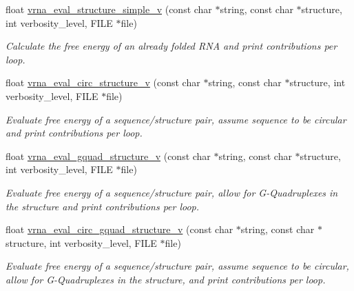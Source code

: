 \begin{DoxyCompactItemize}
float \mbox{\hyperlink{group__eval_gacd6278343e77d13f1d53588e50d303bc}{vrna\+\_\+eval\+\_\+structure\+\_\+simple\+\_\+v}} (const char $\ast$string, const char $\ast$structure, int verbosity\+\_\+level, F\+I\+LE $\ast$file)
\begin{DoxyCompactList}\small\item\em Calculate the free energy of an already folded R\+NA and print contributions per loop. \end{DoxyCompactList}\item 
float \mbox{\hyperlink{group__eval_gac3fb44e0773a51be8efc5f4f595a94a7}{vrna\+\_\+eval\+\_\+circ\+\_\+structure\+\_\+v}} (const char $\ast$string, const char $\ast$structure, int verbosity\+\_\+level, F\+I\+LE $\ast$file)
\begin{DoxyCompactList}\small\item\em Evaluate free energy of a sequence/structure pair, assume sequence to be circular and print contributions per loop. \end{DoxyCompactList}\item 
float \mbox{\hyperlink{group__eval_gaeaa2bdbc1b5d78c667e735fbdff87fff}{vrna\+\_\+eval\+\_\+gquad\+\_\+structure\+\_\+v}} (const char $\ast$string, const char $\ast$structure, int verbosity\+\_\+level, F\+I\+LE $\ast$file)
\begin{DoxyCompactList}\small\item\em Evaluate free energy of a sequence/structure pair, allow for G-\/\+Quadruplexes in the structure and print contributions per loop. \end{DoxyCompactList}\item 
float \mbox{\hyperlink{group__eval_gab96a6c59923ff06c35f8c2fd2c239727}{vrna\+\_\+eval\+\_\+circ\+\_\+gquad\+\_\+structure\+\_\+v}} (const char $\ast$string, const char $\ast$structure, int verbosity\+\_\+level, F\+I\+LE $\ast$file)
\begin{DoxyCompactList}\small\item\em Evaluate free energy of a sequence/structure pair, assume sequence to be circular, allow for G-\/\+Quadruplexes in the structure, and print contributions per loop. \end{DoxyCompactList}\end{DoxyCompactItemize}
